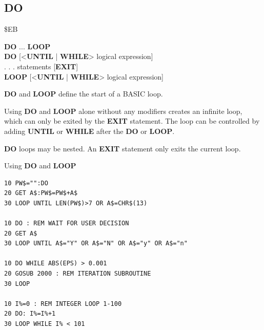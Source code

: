 \subsection{DO}
\begin{description}[leftmargin=2cm,style=nextline]
\item [Token:] \$EB
\item [Format:] {\bf DO} ... {\bf LOOP} \\
                {\bf DO} [<{\bf UNTIL} | {\bf WHILE}> logical expression] \\
                . . . statements [{\bf EXIT}] \\
                {\bf LOOP} [<{\bf UNTIL} | {\bf WHILE}> logical expression]
\item [Usage:] {\bf DO} and {\bf LOOP} define
               the start of a BASIC loop.

               Using {\bf DO} and {\bf LOOP} alone without any
               modifiers creates an infinite loop, which can only be exited
               by the {\bf EXIT} statement. The loop can be
               controlled by adding {\bf UNTIL} or {\bf WHILE}
               after the {\bf DO} or {\bf LOOP}.

\item [Remarks:] {\bf DO} loops may be nested. An {\bf EXIT} statement
               only exits the current loop.
\item [Examples:] Using {\bf DO} and {\bf LOOP}
\begin{tcolorbox}[colback=black,coltext=white]
\verbatimfont{\codefont}
\begin{verbatim}
10 PW$="":DO
20 GET A$:PW$=PW$+A$
30 LOOP UNTIL LEN(PW$)>7 OR A$=CHR$(13)

10 DO : REM WAIT FOR USER DECISION
20 GET A$
30 LOOP UNTIL A$="Y" OR A$="N" OR A$="y" OR A$="n"

10 DO WHILE ABS(EPS) > 0.001
20 GOSUB 2000 : REM ITERATION SUBROUTINE
30 LOOP

10 I%=0 : REM INTEGER LOOP 1-100
20 DO: I%=I%+1
30 LOOP WHILE I% < 101
\end{verbatim}
\end{tcolorbox}
\end{description}


\newpage
